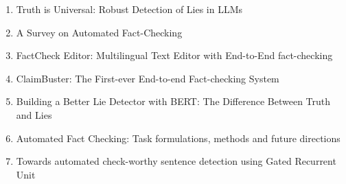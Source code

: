 \documentclass[11pt,letterpaper]{article}
\begin{document}
{\begin{enumerate}
    \item Truth is Universal: Robust Detection of Lies in LLMs
    \item A Survey on Automated Fact-Checking
    \item FactCheck Editor: Multilingual Text Editor with End-to-End fact-checking
    \item ClaimBuster: The First-ever End-to-end Fact-checking System
    \item Building a Better Lie Detector with BERT: The Difference Between Truth and Lies
    \item Automated Fact Checking: Task formulations, methods and future directions
    \item Towards automated check-worthy sentence detection using Gated Recurrent Unit
\end{enumerate}

}
\end{document}
